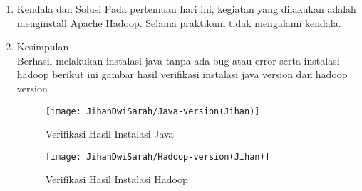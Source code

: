 

\begin{enumerate}
\item Kendala dan Solusi
\newline Pada pertemuan hari ini, kegiatan yang dilakukan adalah menginstall Apache Hadoop. Selama praktikum tidak mengalami kendala.

\item Kesimpulan \\
Berhasil melakukan instalasi java tanpa ada bug atau error serta instalasi hadoop berikut ini gambar hasil verifikasi instalasi java version dan hadoop version 

\begin{figure}[!ht]
\texttt{[image: JihanDwiSarah/Java-version(Jihan)]}
\caption{Verifikasi Hasil Instalasi Java}
\label{gam:Java-version(Jihan)}
\end{figure} 

\begin{figure}[!ht]
\texttt{[image: JihanDwiSarah/Hadoop-version(Jihan)]}
\caption{Verifikasi Hasil Instalasi Hadoop}
\label{gam:Hadoop-version(Jihan)}
\end{figure}
\end{enumerate}


